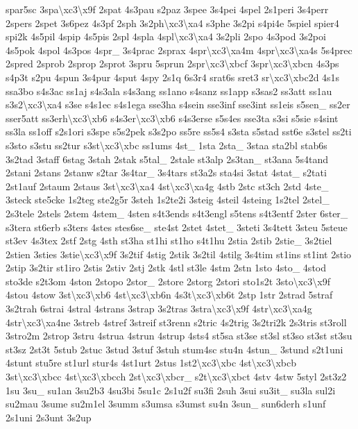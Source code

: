 \begin{DoxyCompactItemize}
spar5sc 3spa\textbackslash{}xc3\textbackslash{}x9f 2spat 4s3pau s2paz 3spee 3s4pei 4spel 2s1peri 3s4perr 2spers 2spet 3s6pez 4s3pf 2sph 3s2ph\textbackslash{}xc3\textbackslash{}xa4 s3phe 3s2pi s4pi4e 5spiel spier4 spi2k 4s5pil 4spip 4s5pis 2spl 4spla 4spl\textbackslash{}xc3\textbackslash{}xa4 3s2pli 2spo 4s3pod 3s2poi 4s5pok 4spol 4s3pos 4spr\-\_\- 3s4prac 2sprax 4spr\textbackslash{}xc3\textbackslash{}xa4m 4spr\textbackslash{}xc3\textbackslash{}xa4s 5s4prec 2spred 2sprob 2sprop 2sprot 3spru 5sprun 2spr\textbackslash{}xc3\textbackslash{}xbcf 3spr\textbackslash{}xc3\textbackslash{}xbcn 4s3ps s4p3t s2pu 4spun 3s4pur 4sput 4spy 2s1q 6s3r4 srat6s sret3 sr\textbackslash{}xc3\textbackslash{}xbc2d 4s1s ssa3bo s4s3ac ss1aj s4s3ala s4s3ang ss1ano s4sanz ss1app s3sas2 ss3att ss1au s3s2\textbackslash{}xc3\textbackslash{}xa4 s3se s4s1ec s4s1ega sse3ha s4sein sse3inf sse3int ss1eis s5sen\-\_\- ss2er sser5att ss3erh\textbackslash{}xc3\textbackslash{}xb6 s4s3er\textbackslash{}xc3\textbackslash{}xb6 s4s3erse s5s4es sse3ta s3si s5sie s4sint ss3la ss1off s2s1ori s3spe s5s2pek s3s2po ss5re ss5s4 s3sta s5stad sst6e s3stel ss2ti s3sto s3stu ss2tur s3st\textbackslash{}xc3\textbackslash{}xbc ss1ums 4st\-\_\- 1sta 2sta\-\_\- 3staa sta2bl stab6s 3s2tad 3staff 6stag 3stah 2stak s5tal\-\_\- 2stale st3alp 2s3tan\-\_\- st3ana 5s4tand 2stani 2stans 2stanw s2tar 3s4tar\-\_\- 3s4tars st3a2s sta4si 3stat 4stat\-\_\- s2tati 2st1auf 2staum 2staus 3st\textbackslash{}xc3\textbackslash{}xa4 4st\textbackslash{}xc3\textbackslash{}xa4g 4stb 2stc st3ch 2std 4ste\-\_\- 3steck ste5cke 1s2teg ste2g5r 3steh 1s2te2i 3steig 4steil 4steing 1s2tel 2stel\-\_\- 2s3tele 2stels 2stem 4stem\-\_\- 4sten s4t3ends s4t3engl s5tens s4t3entf 2ster 6ster\-\_\- s3tera st6erb s3ters 4stes stes6se\-\_\- ste4st 2stet 4stet\-\_\- 3steti 3s4tett 3steu 5steue st3ev 4s3tex 2stf 2stg 4sth st3ha st1hi st1ho s4t1hu 2stia 2stib 2stie\-\_\- 3s2tiel 2stien 3sties 3stie\textbackslash{}xc3\textbackslash{}x9f 3s2tif 4stig 2stik 3s2til 4stilg 3s4tim st1ins st1int 2stio 2stip 3s2tir st1iro 2stis 2stiv 2stj 2stk 4stl st3le 4stm 2stn 1sto 4sto\-\_\- 4stod sto3de s2t3om 4ston 2stopo 2stor\-\_\- 2store 2storg 2stori sto1s2t 3sto\textbackslash{}xc3\textbackslash{}x9f 4stou 4stow 3st\textbackslash{}xc3\textbackslash{}xb6 4st\textbackslash{}xc3\textbackslash{}xb6n 4s3t\textbackslash{}xc3\textbackslash{}xb6t 2stp 1str 2strad 5straf 3s2trah 6strai 4stral 4strans 3strap 3s2tras 3stra\textbackslash{}xc3\textbackslash{}x9f 4str\textbackslash{}xc3\textbackslash{}xa4g 4str\textbackslash{}xc3\textbackslash{}xa4ne 3streb 4stref 3streif st3renn s2tric 4s2trig 3s2tri2k 2s3tris st3roll 3stro2m 2strop 3stru 4strua 4strun 4strup 4sts4 st5sa st3se st3sl st3so st3st st3su st3sz 2st3t 5stub 2stuc 3stud 3stuf 3stuh stum4sc stu4n 4stun\-\_\- 3stund s2t1uni 4stunt stu5re st1url stur4s 4st1urt 2stus 1st2\textbackslash{}xc3\textbackslash{}xbc 4st\textbackslash{}xc3\textbackslash{}xbcb 3st\textbackslash{}xc3\textbackslash{}xbcc 4st\textbackslash{}xc3\textbackslash{}xbcch 2st\textbackslash{}xc3\textbackslash{}xbcr\-\_\- s2t\textbackslash{}xc3\textbackslash{}xbct 4stv 4stw 5styl 2st3z2 1su 3su\-\_\- su1an 3su2b3 4su3bi 5su1c 2s1u2f su3fi 2suh 3sui su3it\-\_\- su3la sul2i su2mau 3sume su2m1el 3summ s3umsa s3umst su4n 3sun\-\_\- sun6derh s1unf 2s1uni 2s3unt 3s2up 
\end{DoxyCompactItemize}
